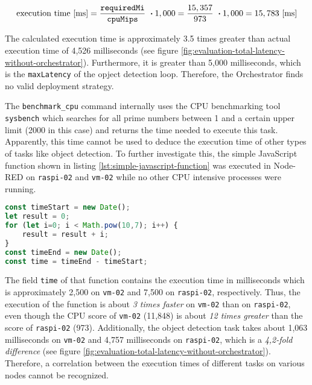 \[\textrm{execution time [ms]} = \frac{\textrm{\texttt{requiredMi}}}{\textrm{\texttt{cpuMips}}}\ \boldsymbol{\cdot} 1,000 = \frac{15,357}{973}\ \boldsymbol{\cdot} 1,000 = 15,783 \textrm{ [ms]}\]

The calculated execution time is approximately 3.5 times greater than actual execution time of 4,526 milliseconds (see figure \ref{fig:evaluation-total-latency-without-orchestrator}).
Furthermore, it is greater than 5,000 milliseconds, which is the \texttt{maxLatency} of the opject detection loop. 
Therefore, the Orchestrator finds no valid deployment strategy.

The \texttt{benchmark\_cpu} command internally uses the CPU benchmarking tool \texttt{sysbench} which searches for all prime numbers between 1 and a certain upper limit (2000 in this case) and returns the time needed to execute this task.
Apparently, this time cannot be used to deduce the execution time of other types of tasks like object detection.
To further investigate this, the simple JavaScript function shown in listing \ref{lst:simple-javascript-function} was executed in Node-RED on \texttt{raspi-02} and \texttt{vm-02} while no other CPU intensive processes were running.

\begin{lstlisting}[language=JavaScript,numbers=none,caption={JavaScript function which executes simple mathematical tasks while measuring the total execution time},label=lst:simple-javascript-function]
const timeStart = new Date();
let result = 0;
for (let i=0; i < Math.pow(10,7); i++) {
    result = result + i;
}
const timeEnd = new Date();
const time = timeEnd - timeStart;
\end{lstlisting}

The field \texttt{time} of that function contains the execution time in milliseconds which is approximately 2,500 on \texttt{vm-02} and 7,500 on \texttt{raspi-02}, respectively. 
Thus, the execution of the function is about \textit{3 times faster} on \texttt{vm-02} than on \texttt{raspi-02}, even though the CPU score of \texttt{vm-02} (11,848) is about \textit{12 times greater} than the score of \texttt{raspi-02} (973).
Additionally, the object detection task takes about 1,063 milliseconds on \texttt{vm-02} and 4,757 milliseconds on \texttt{raspi-02}, which is a \textit{4,2-fold difference} (see figure \ref{fig:evaluation-total-latency-without-orchestrator}).
Therefore, a correlation between the execution times of different tasks on various nodes cannot be recognized.

